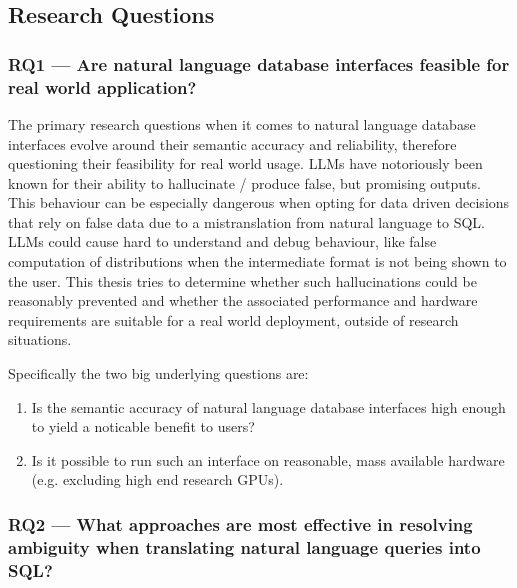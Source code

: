 \subsection{Research Questions}


\subsubsection*{RQ1 — Are natural language database interfaces feasible for real world application?}

The primary research questions when it comes to natural language database interfaces evolve around their
semantic accuracy and reliability, therefore questioning their feasibility for real world usage.
LLMs have notoriously been known for their ability to hallucinate / produce false, but promising outputs.
This behaviour can be especially  dangerous when opting for data driven decisions that rely on false data
due to a mistranslation from natural language to SQL. LLMs could cause hard to understand and debug behaviour,
like false computation of distributions when the intermediate format is not being shown to the user. This
thesis tries to determine whether such hallucinations could be reasonably prevented and whether the associated
performance and hardware requirements are suitable for a real world deployment, outside of research situations.

Specifically the two big underlying questions are:

\begin{enumerate}
    \item Is the semantic accuracy of natural language database interfaces high enough to yield a noticable
          benefit to users?
    \item Is it possible to run such an interface on reasonable, mass available hardware (e.g. excluding high end research GPUs).
\end{enumerate}

\subsubsection*{RQ2 — What approaches are most effective in resolving ambiguity when translating natural language queries into SQL?}

